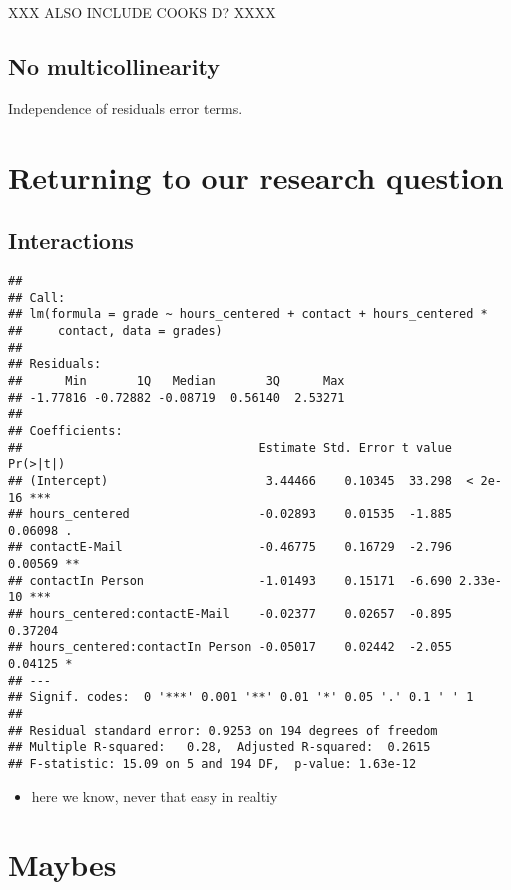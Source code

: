 \documentclass[
]{book}
\providecommand{\tightlist}{%
  \setlength{\itemsep}{0pt}\setlength{\parskip}{0pt}}
\begin{document}
XXX ALSO INCLUDE COOKS D? XXXX

\hypertarget{no-multicollinearity}{%
\subsection{No multicollinearity}\label{no-multicollinearity}}

Independence of residuals error terms.

\hypertarget{returning-to-our-research-question-1}{%
\section{Returning to our research question}\label{returning-to-our-research-question-1}}

\hypertarget{interactions}{%
\subsection{Interactions}\label{interactions}}

\begin{verbatim}
## 
## Call:
## lm(formula = grade ~ hours_centered + contact + hours_centered * 
##     contact, data = grades)
## 
## Residuals:
##      Min       1Q   Median       3Q      Max 
## -1.77816 -0.72882 -0.08719  0.56140  2.53271 
## 
## Coefficients:
##                                 Estimate Std. Error t value Pr(>|t|)    
## (Intercept)                      3.44466    0.10345  33.298  < 2e-16 ***
## hours_centered                  -0.02893    0.01535  -1.885  0.06098 .  
## contactE-Mail                   -0.46775    0.16729  -2.796  0.00569 ** 
## contactIn Person                -1.01493    0.15171  -6.690 2.33e-10 ***
## hours_centered:contactE-Mail    -0.02377    0.02657  -0.895  0.37204    
## hours_centered:contactIn Person -0.05017    0.02442  -2.055  0.04125 *  
## ---
## Signif. codes:  0 '***' 0.001 '**' 0.01 '*' 0.05 '.' 0.1 ' ' 1
## 
## Residual standard error: 0.9253 on 194 degrees of freedom
## Multiple R-squared:   0.28,  Adjusted R-squared:  0.2615 
## F-statistic: 15.09 on 5 and 194 DF,  p-value: 1.63e-12
\end{verbatim}

\begin{itemize}
\tightlist
\item
  here we know, never that easy in realtiy
\end{itemize}

\hypertarget{maybes}{%
\section{Maybes}\label{maybes}}
\end{document}
